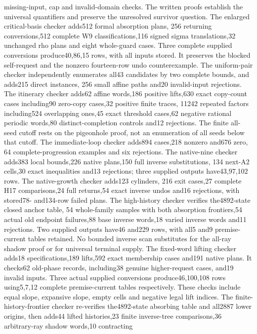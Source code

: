 \documentclass[11pt]{article}
\begin{document}
missing-input, cap and invalid-domain checks. The written proofs establish
the universal quantifiers and preserve the unresolved survivor question.
The enlarged critical-basis checker adds512 formal absorption plans,
256 returning conversions,512 complete W9 classifications,116 signed
sigma translations,32 unchanged rho plans and eight whole-guard cases.
Three complete supplied conversions produce40,86,15 rows, with all inputs
stored. It preserves the blocked self-request and the nonzero fourteen-row
undo counterexample. The uniform-pair checker independently enumerates
all43 candidates by two complete bounds, and adds215 direct instances,
256 small affine paths and20 invalid-input rejections.
The itinerary checker adds62 affine words,186 positive lifts,630 exact
copy-count cases including90 zero-copy cases,32 positive finite traces,
11242 repeated factors including524 overlapping ones,45 exact threshold
cases,62 negative rational periodic words,80 distinct-completion controls
and12 rejections. The finite all-seed cutoff rests on the pigeonhole proof,
not an enumeration of all seeds below that cutoff.
The immediate-loop checker adds894 cases,218 nonzero and676 zero,
64 complete-progression examples and six rejections. The native-nine
checker adds383 local bounds,226 native plans,150 full inverse substitutions,
134 next-A2 cells,30 exact inequalities and13 rejections; three supplied
outputs have43,97,102 rows. The native-growth checker adds123 cylinders,
216 exit cases,27 complete H17 comparisons,24 full returns,54 exact
inverse undos and16 rejections, with stored78- and134-row failed plans.
The high-history checker verifies the4892-state closed anchor table,
54 whole-family samples with both absorption frontiers,54 actual old
endpoint failures,88 base inverse words,18 varied inverse words and11
rejections. Two supplied outputs have46 and229 rows, with all5 and9
premise-current tables retained. No bounded inverse scan substitutes for
the all-ray shadow proof or for universal terminal supply.
The fixed-word lifting checker adds18 specifications,189 lifts,592 exact
membership cases and191 native plans. It checks62 old-phase records,
including38 genuine higher-request cases, and19 invalid inputs.
Three actual supplied conversions produce46,100,108 rows using5,7,12
complete premise-current tables respectively. These checks include equal
slope, expansive slope, empty cells and negative legal lift indices.
The finite-history-frontier checker re-verifies the4892-state absorbing
table and all2887 lower origins, then adds44 lifted histories,23 finite
inverse-tree comparisons,36 arbitrary-ray shadow words,10 contracting
\end{document}
